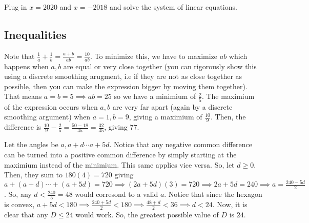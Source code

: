 \documentclass[11pt]{article}
\begin{document}

\begin{sol}
Plug in $x=2020$ and $x=-2018$ and solve the system of linear equations.
\end{sol}

\subsection{Inequalities}

\begin{sol}
Note that $\frac{1}{a}+\frac{1}{b}=\frac{a+b}{ab}=\frac{10}{ab}$. To minimize this, we have to maximize $ab$ which happens when $a,b$ are equal or very close together (you can rigorously show this using a discrete smoothing arugment, i.e if they are not as close together as possible, then you can make the expression bigger by moving them together). That means $a=b=5\implies ab=25$ so we have a minimium of $\frac{2}{5}$. The maximium of the expression occurs when $a,b$ are very far apart (again by a discrete smoothing argument) when $a=1, b=9$, giving a maximium of $\frac{10}{9}$. Then, the difference is $\frac{10}{9}-\frac{2}{5}=\frac{50-18}{45}=\frac{32}{45}$, giving $\boxed{77}$.
\end{sol}


\begin{sol}
Let the angles be $a,a+d\cdots a+5d$.  Notice that any negative common difference can be turned into a positive common difference by simply starting at the maximium instead of the minimium. This same applies vice versa. So, let $d\ge 0$. Then, they sum to $180(4)=720$ giving $a+(a+d)\cdots + (a+5d)=720\implies (2a+5d)(3)=720\implies 2a+5d=240\implies a =\frac{240-5d}{2}$. So, any $d<\frac{240}{5}=48$ would corresond to a valid $a$. Notice that since the hexagon is convex, $a+5d<180\implies \frac{240+5d}{2} < 180 \implies \frac{48+d}{2} < 36\implies d < 24$. Now, it is clear that any $D\leq 24$ would work. So, the greatest possible value of $D$ is $\boxed{24}$.
\end{sol}
\end{document}
